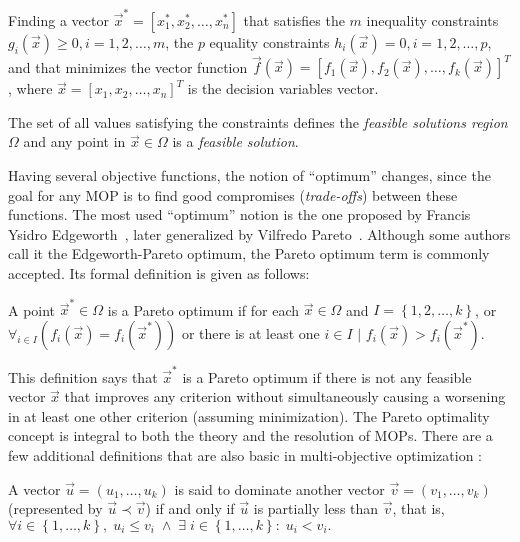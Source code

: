 \begin{definition}[MOP]
	\label{def:MOP} Finding a vector $\vec{x}^*= \left[x_1^*, x_2^*, \ldots,x_n^* \right]$ that satisfies the $m$
	inequality constraints $g_i\left(\vec{x}\right) \geq 0, i= 1,2,\ldots,m$, the $p$ equality constraints
	$h_i\left(\vec{x}\right) = 0, i= 1,2,\ldots,p$, and that minimizes the vector function \sloppy $\vec{f}\left(\vec{x}\right) = \left[f_1(\vec{x}),f_2(\vec{x}), \ldots , f_k(\vec{x}) \right]^T$, where $\vec{x} = \left[x_1,x_2,\ldots,x_n \right]^T$ is the decision variables vector.
\end{definition}

The set of all values satisfying the constraints defines the \emph{feasible solutions region} $\Omega$ and any point in $\vec{x} \in \Omega$ is a \emph{feasible solution}.

Having several objective functions, the notion of ``optimum'' changes, since the goal for any MOP is to find good compromises (\emph{trade-offs}) between these functions. The most used ``optimum'' notion is the one proposed by Francis Ysidro Edgeworth~\cite{edgeworth81mathematical}, later generalized by Vilfredo Pareto~\cite{pareto96cours}. Although some authors call it the Edgeworth-Pareto optimum, the Pareto optimum term is commonly accepted. Its formal definition is given as follows:

\begin{definition} \label{def:ParetoOptimum}A point $\vec{x}^* \in \Omega$ is a Pareto optimum if for each $\vec{x} \in \Omega$ and $I = \left\{1,2,\ldots,k \right\}$, or $\forall_{i \in I} \left( f_i \left(
	\vec{x} \right) = f_i(\vec{x}^*) \right)$ or there is at least one $i \in I$ $|$ $f_i\left(\vec{x}\right) >
	f_i\left(\vec{x}^*\right)$.
\end{definition}

This definition says that  $\vec{x}^*$ is a Pareto optimum if there is not any feasible vector  $\vec{x}$ that improves any criterion without simultaneously causing a worsening in at least one other criterion (assuming minimization). The Pareto optimality concept is integral to both the theory and the resolution of MOPs. There are a few additional definitions that are also basic in multi-objective optimization \cite{veldhuizen99phd}:

\begin{definition} \label{def:ParetoDominance} A vector $\vec{u} = \left(u_1, \ldots, u_k \right)$ is said to dominate another vector $\vec{v}\!\! =\!\! \left(v_1, \ldots, v_k \right)$ (represented by $\vec{u} \prec \vec{v}$) if and only if $\vec{u}$ is partially less than \sloppy $\vec{v}$, that is, $\forall i \in \left\{1, \ldots, k \right\}, \; u_i \leq v_i \;\wedge \; \exists \; i \in \left\{1, \ldots, k \right\}: \; u_i < v_i.$
\end{definition} 

